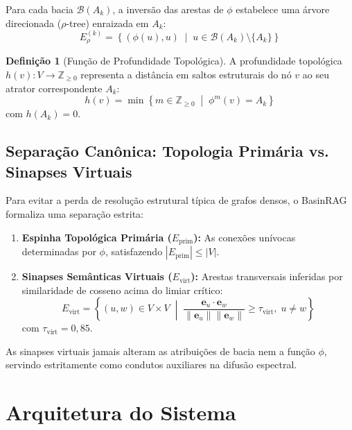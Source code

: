 \documentclass[10pt,twocolumn]{article}
\theoremstyle{definition}
\newtheorem{definition}{Definição}
\begin{document}
Para cada bacia $\mathcal{B}(A_k)$, a inversão das arestas de $\phi$ estabelece uma árvore direcionada ($\rho$-tree) enraizada em $A_k$:
\begin{equation}
E_\rho^{(k)} = \left\{ (\phi(u), u) \;\middle|\; u \in \mathcal{B}(A_k) \setminus \{A_k\} \right\}
\end{equation}

\begin{definition}[Função de Profundidade Topológica]
A profundidade topológica $h(v): V \to \mathbb{Z}_{\ge 0}$ representa a distância em saltos estruturais do nó $v$ ao seu atrator correspondente $A_k$:
\begin{equation}
h(v) = \min \left\{ m \in \mathbb{Z}_{\ge 0} \;\middle|\; \phi^m(v) = A_k \right\}
\end{equation}
com $h(A_k) = 0$.
\end{definition}

\subsection{Separação Canônica: Topologia Primária vs. Sinapses Virtuais}

Para evitar a perda de resolução estrutural típica de grafos densos, o BasinRAG formaliza uma separação estrita:
\begin{enumerate}
    \item \textbf{Espinha Topológica Primária ($E_{\text{prim}}$):} As conexões unívocas determinadas por $\phi$, satisfazendo $|E_{\text{prim}}| \le |V|$.
    \item \textbf{Sinapses Semânticas Virtuais ($E_{\text{virt}}$):} Arestas transversais inferidas por similaridade de cosseno acima do limiar crítico:
    \begin{equation}
    E_{\text{virt}} = \left\{ (u, w) \in V \times V \;\middle|\; \frac{\mathbf{e}_u \cdot \mathbf{e}_w}{\|\mathbf{e}_u\| \|\mathbf{e}_w\|} \ge \tau_{\text{virt}}, \; u \ne w \right\}
    \end{equation}
    com $\tau_{\text{virt}} = 0,85$.
\end{enumerate}
As sinapses virtuais jamais alteram as atribuições de bacia nem a função $\phi$, servindo estritamente como condutos auxiliares na difusão espectral.

\section{Arquitetura do Sistema}
\end{document}
